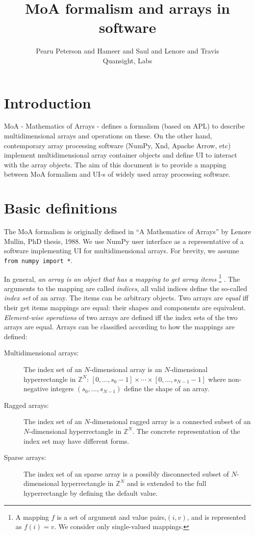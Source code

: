 \documentclass[a4paper,12pt]{article}
\title{MoA formalism and arrays in software}
\author{Pearu Peterson and Hameer and Saul and Lenore and Travis\\
Quansight, Labs}
\newcommand{\Z}{{\mathbb{Z}}}                     %
\begin{document}
\maketitle
\section{Introduction}

MoA - Mathematics of Arrays - defines a formalism (based on APL) to
describe multidimensional arrays and operations on these. On the other
hand, contemporary array processing software (NumPy, Xnd, Apache
Arrow, etc) implement multidimensional array container objects and
define UI to interact with the array objects. The aim of this document
is to provide a mapping between MoA formalism and UI-s of widely used
array processing software.

\section{Basic definitions}

The MoA formalism is originally defined in ``A Mathematics of Arrays''
by Lenore Mullin, PhD thesis, 1988\cite{mul00}.  We use NumPy
\cite{travis0} user interface as a representative of a software
implementing UI for multidimensional arrays. For brevity, we assume
\verb+from numpy import *+.

\noindent
In general, \emph{an array is an object that has a mapping to get
  array items} \footnote{A mapping $f$ is a set of argument and value
  pairs,$(i,v)$, and is represented as $f(i)=v$. We consider only
  single-valued mappings.} . The arguments to the mapping are called
\emph{indices}, all valid indices define the so-called \emph{index
  set} of an array. The items can be arbitrary objects.
Two arrays are \emph{equal} iff their get items mappings are equal: their shapes and components are equivalent.
\emph{Element-wise operations} of two arrays are defined iff the index
sets of the two arrays are equal.
Arrays can be classified according to how the mappings are defined:
\begin{description}
\item[Multidimensional arrays:] The index set of
  an $N$-dimensional array is an $N$-dimensional hyperrectangle in
  $\Z^N$: $[0,\ldots,s_0-1]\times\cdots\times[0,\ldots,s_{N-1}-1]$
  where non-negative integers $(s_0,\ldots,s_{N-1})$ define the shape
  of an array.
\item[Ragged arrays:] The index set of an
  $N$-dimensional ragged array is a connected subset of an
  $N$-dimensional hyperrectangle in $\Z^N$. The concrete
  representation of the index set may have different forms.
\item[Sparse arrays:] The index set of an sparse array is a possibly
  disconnected subset of $N$-dimensional hyperrectangle in $\Z^N$ and
  is extended to the full hyperrectangle by defining the default
  value.
\end{description}
\end{document}
